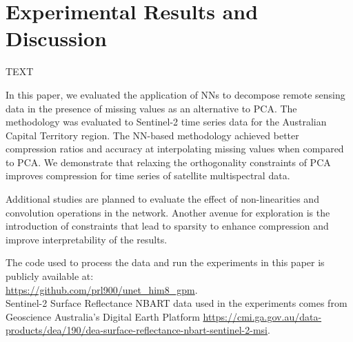 \documentclass[essd, manuscript]{copernicus}
\begin{document}
\section{Experimental Results and Discussion}
TEXT


\conclusions  %
In this paper, we evaluated the application of NNs to decompose remote sensing data in the presence of missing values as an alternative to PCA. The methodology was evaluated to Sentinel-2 time series data for the Australian Capital Territory region. The NN-based methodology achieved better compression ratios and accuracy at interpolating missing values when compared to PCA. We demonstrate that relaxing the orthogonality constraints of PCA improves compression for time series of satellite multispectral data.

Additional studies are planned to evaluate the effect of non-linearities and convolution operations in the network. Another avenue for exploration is the introduction of constraints that lead to sparsity to enhance compression and improve interpretability of the results. 






\codedataavailability{} 
The code used to process the data and run the experiments in this paper is publicly available at: \\
\href{https://github.com/prl900/unet_him8_gpm}{https://github.com/prl900/unet\_him8\_gpm}. \\
Sentinel-2 Surface Reflectance NBART data used in the experiments comes from Geoscience Australia's Digital Earth Platform \href{https://cmi.ga.gov.au/data-products/dea/190/dea-surface-reflectance-nbart-sentinel-2-msi}{https://cmi.ga.gov.au/data-products/dea/190/dea-surface-reflectance-nbart-sentinel-2-msi}. 

\end{document}

